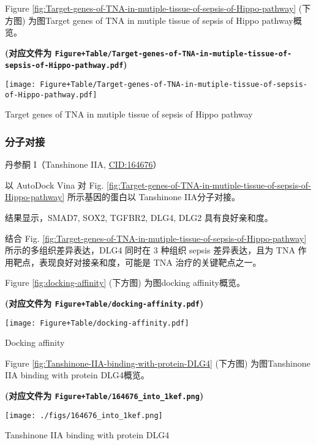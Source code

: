 \documentclass[
]{article}
\begin{document}
Figure \ref{fig:Target-genes-of-TNA-in-mutiple-tissue-of-sepsis-of-Hippo-pathway} (下方图) 为图Target genes of TNA in mutiple tissue of sepsis of Hippo pathway概览。

\textbf{(对应文件为 \texttt{Figure+Table/Target-genes-of-TNA-in-mutiple-tissue-of-sepsis-of-Hippo-pathway.pdf})}

\def\@captype{figure}
\begin{center}
\texttt{[image: Figure+Table/Target-genes-of-TNA-in-mutiple-tissue-of-sepsis-of-Hippo-pathway.pdf]}
\caption{Target genes of TNA in mutiple tissue of sepsis of Hippo pathway}\label{fig:Target-genes-of-TNA-in-mutiple-tissue-of-sepsis-of-Hippo-pathway}
\end{center}

\hypertarget{ux5206ux5b50ux5bf9ux63a5}{%
\subsubsection{分子对接}\label{ux5206ux5b50ux5bf9ux63a5}}

丹参酮 I（Tanshinone IIA, \url{CID:164676}）

以 AutoDock Vina 对 Fig. \ref{fig:Target-genes-of-TNA-in-mutiple-tissue-of-sepsis-of-Hippo-pathway} 所示基因的蛋白以 Tanshinone IIA分子对接。

结果显示，SMAD7, SOX2, TGFBR2, DLG4, DLG2 具有良好亲和度。

结合 Fig. \ref{fig:Target-genes-of-TNA-in-mutiple-tissue-of-sepsis-of-Hippo-pathway} 所示的多组织差异表达，DLG4 同时在 3 种组织 sepsis 差异表达，且为 TNA 作用靶点，表现良好对接亲和度，可能是 TNA 治疗的关键靶点之一。

Figure \ref{fig:docking-affinity} (下方图) 为图docking affinity概览。

\textbf{(对应文件为 \texttt{Figure+Table/docking-affinity.pdf})}

\def\@captype{figure}
\begin{center}
\texttt{[image: Figure+Table/docking-affinity.pdf]}
\caption{Docking affinity}\label{fig:docking-affinity}
\end{center}

Figure \ref{fig:Tanshinone-IIA-binding-with-protein-DLG4} (下方图) 为图Tanshinone IIA binding with protein DLG4概览。

\textbf{(对应文件为 \texttt{Figure+Table/164676\_into\_1kef.png})}

\def\@captype{figure}
\begin{center}
\texttt{[image: ./figs/164676\_into\_1kef.png]}
\caption{Tanshinone IIA binding with protein DLG4}\label{fig:Tanshinone-IIA-binding-with-protein-DLG4}
\end{center}
\end{document}
